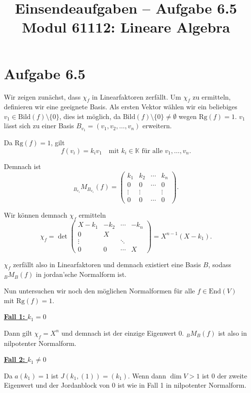 \documentclass[a4paper,12pt]{article}
\title{Einsendeaufgaben -- Aufgabe 6.5\\[0.5em]
\large Modul 61112: Lineare Algebra}
\author{}
\date{}
\begin{document}
\maketitle

\section*{Aufgabe 6.5}

Wir zeigen zunächst, dass $\chi_f$ in Linearfaktoren zerfällt. Um $\chi_f$ zu
ermitteln, definieren wir eine geeignete Basis. Als ersten Vektor wählen wir ein
beliebiges $v_1 \in \mathrm{Bild}(f) \setminus \{0\}$, dies ist möglich, da
$\mathrm{Bild}(f) \setminus \{0\} \neq \emptyset$ wegen $\mathrm{Rg}(f) = 1$.
$v_1$ lässt sich zu einer Basis $B_{v_1} = (v_1, v_2, \ldots, v_n)$ erweitern.

Da $\mathrm{Rg}(f) = 1$, gilt
\[
  f(v_i) = k_i v_1 \quad \text{mit } k_i \in \mathbb{K} \text{ für alle } v_1, \ldots, v_n.
\]

Demnach ist
\[
  {}_{B_{v_1}}M_{B_{v_1}}(f) = \begin{pmatrix}
    k_1 & k_2 & \cdots & k_n \\
    0 & 0 & \cdots & 0 \\
    \vdots & \vdots & & \vdots \\
    0 & 0 & \cdots & 0
  \end{pmatrix}.
\]

Wir können demnach $\chi_f$ ermitteln
\[
  \chi_f = \det \begin{pmatrix}
    X-k_1 & -k_2 & \cdots & -k_n \\
    0 & X & & \\
    \vdots & & \ddots & \\
    0 & 0 & \cdots & X
  \end{pmatrix} = X^{n-1}(X - k_1).
\]

$\chi_f$ zerfällt also in Linearfaktoren und demnach existiert eine Basis $B$,
sodass ${}_{B}M_{B}(f)$ in jordan'sche Normalform ist.

Nun untersuchen wir noch den möglichen Normalformen für alle
$f \in \mathrm{End}(V)$ mit $\mathrm{Rg}(f) = 1$.

\textbf{\underline{Fall 1: $k_1 = 0$}}

Dann gilt $\chi_f = X^n$ und demnach ist der einzige Eigenwert $0$.
${}_{B}M_{B}(f)$ ist also in nilpotenter Normalform.

\textbf{\underline{Fall 2: $k_1 \neq 0$}}

Da $a(k_1) = 1$ ist $J(k_1, (1)) = (k_1)$. Wenn dann $\dim V > 1$ ist $0$ der
zweite Eigenwert und der Jordanblock von $0$ ist wie in Fall 1 in nilpotenter
Normalform.
\end{document}
